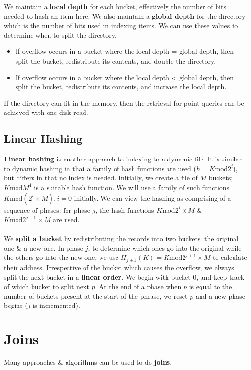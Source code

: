 \documentclass[a4paper,11pt]{article}
\begin{document}
We maintain a \textbf{local depth} for each bucket, effectively the number of bits needed to hash an item here.
We also maintain a \textbf{global depth} for the directory which is the number of bits used in indexing items.
We can use these values to determine when to split the directory.
\begin{itemize}
    \item   If overflow occurs in a bucket where the local depth = global depth, then split the bucket, 
            redistribute its contents, and double the directory.
    \item   If overflow occurs in a bucket where the local depth < global depth, then split the bucket,
            redistribute its contents, and increase the local depth.
\end{itemize}

If the directory can fit in the memory, then the retrieval for point queries can be achieved with one disk read.

\subsection{Linear Hashing}
\textbf{Linear hashing} is another approach to indexing to a dynamic file.
It is similar to dynamic hashing in that a family of hash functions are used ($h = K \text{mod} 2^i$), but
differs in that no index is needed.
Initially, we create a file of $M$ buckets; $K \text{mod} M^1$ is a suitable hash function.
We will use a family of such functions $K \text{mod} (2^i \times M), i = 0$ initially.
We can view the hashing as comprising of a sequence of phases: for phase $j$, the hash functions
$K \text{mod} 2^i \times M$ \& $K \text{mod} 2^{j+1} \times M$ are used.
\\\\
We \textbf{split a bucket} by redistributing the records into two buckets: the original one \& a new one.
In phase $j$, to determine which ones go into the original while the others go into the new one, we use 
$H_{j+1}(K) = K \text{mod} 2^{j+1} \times M$ to calculate their address.
Irrespective of the bucket which causes the overflow, we always split the next bucket in a \textbf{linear order}.
We begin with bucket 0, and keep track of which bucket to split next $p$.
At the end of a phase when $p$ is equal to the number of buckets present at the start of the phrase, we reset $p$
and a new phase begins ($j$ is incremented).

\section{Joins}
Many approaches \& algorithms can be used to do \textbf{joins}.
\end{document}
